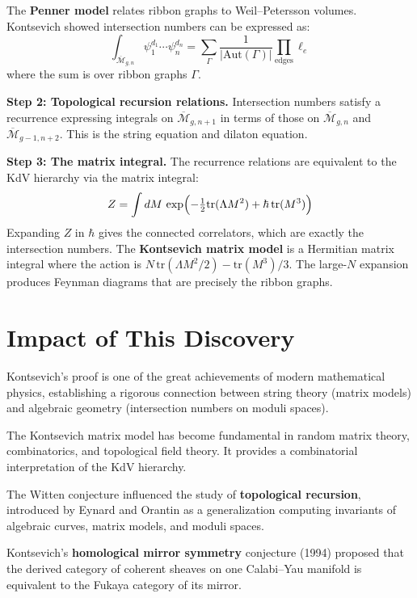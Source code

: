 The \textbf{Penner model} relates ribbon graphs to Weil--Petersson
volumes.  Kontsevich showed intersection numbers can be expressed
as:
\[
  \int_{\overline{\mathcal{M}}_{g,n}}
    \psi_1^{d_1}\cdots\psi_n^{d_n}
  = \sum_{\Gamma}\frac{1}{|\mathrm{Aut}(\Gamma)|}
    \prod_{\text{edges}}\ell_e
\]
where the sum is over ribbon graphs $\Gamma$.

\textbf{Step 2: Topological recursion relations.}
Intersection numbers satisfy a recurrence expressing integrals on
$\overline{\mathcal{M}}_{g,n+1}$ in terms of those on
$\overline{\mathcal{M}}_{g,n}$ and $\overline{\mathcal{M}}_{g-1,n+2}$.
This is the string equation and dilaton equation.

\textbf{Step 3: The matrix integral.}
The recurrence relations are equivalent to the KdV hierarchy via
the matrix integral:
\[
  Z = \int dM\,
       \exp\Bigl(-\tfrac{1}{2}\mathrm{tr}(\Lambda M^2)
                 +\hbar\,\mathrm{tr}(M^3)\Bigr)
\]
Expanding $Z$ in $\hbar$ gives the connected correlators, which are
exactly the intersection numbers.  The \textbf{Kontsevich matrix
model} is a Hermitian matrix integral where the action is
$N\,\mathrm{tr}(\Lambda M^2/2)-\mathrm{tr}(M^3)/3$.  The large-$N$
expansion produces Feynman diagrams that are precisely the ribbon
graphs.

\section{Impact of This Discovery}

Kontsevich's proof \cite{kontsevich1992} is one of the great achievements of modern
mathematical physics, establishing a rigorous connection between
string theory (matrix models) and algebraic geometry (intersection
numbers on moduli spaces).

The Kontsevich matrix model has become fundamental in random matrix
theory, combinatorics, and topological field theory.  It provides a
combinatorial interpretation of the KdV hierarchy.

The Witten conjecture influenced the study of \textbf{topological
recursion}, introduced by Eynard and Orantin as a generalization
computing invariants of algebraic curves, matrix models, and moduli
spaces.

Kontsevich's \textbf{homological mirror symmetry} conjecture
(1994) proposed that the derived category of coherent sheaves on one
Calabi--Yau manifold is equivalent to the Fukaya category of its
mirror.

